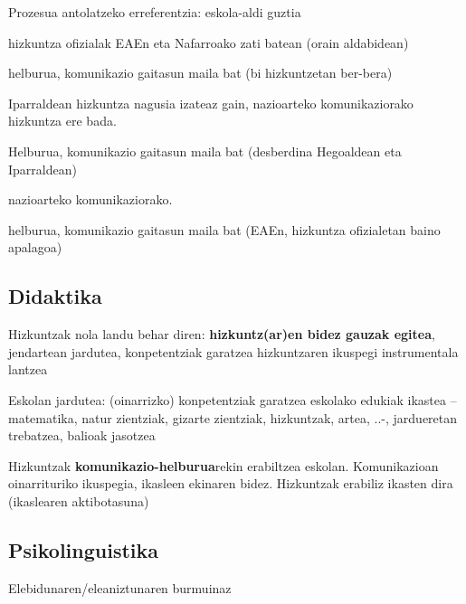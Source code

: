 \documentclass[
]{book}
\providecommand{\tightlist}{%
  \setlength{\itemsep}{0pt}\setlength{\parskip}{0pt}}
\begin{document}
Prozesua antolatzeko erreferentzia: eskola-aldi guztia

\begin{description}
\tightlist
\item[Euskara eta gaztelania]
hizkuntza ofizialak EAEn eta Nafarroako zati batean (orain aldabidean)

helburua, komunikazio gaitasun maila bat (bi hizkuntzetan ber-bera)
\item[Frantsesa]
Iparraldean hizkuntza nagusia izateaz gain, nazioarteko komunikaziorako hizkuntza ere bada.

Helburua, komunikazio gaitasun maila bat (desberdina Hegoaldean eta Iparraldean)
\item[Ingelesa]
nazioarteko komunikaziorako.

helburua, komunikazio gaitasun maila bat (EAEn, hizkuntza ofizialetan baino apalagoa)
\end{description}

\hypertarget{didaktika}{%
\subsection{Didaktika}\label{didaktika}}

Hizkuntzak nola landu behar diren: \textbf{hizkuntz(ar)en bidez gauzak egitea}, jendartean jardutea, konpetentziak garatzea hizkuntzaren ikuspegi instrumentala lantzea

Eskolan jardutea: (oinarrizko) konpetentziak garatzea eskolako edukiak ikastea --matematika, natur zientziak, gizarte zientziak, hizkuntzak, artea, ..-, jardueretan trebatzea, balioak jasotzea

Hizkuntzak \textbf{komunikazio-helburua}rekin erabiltzea eskolan. Komunikazioan oinarrituriko ikuspegia, ikasleen ekinaren bidez. Hizkuntzak erabiliz ikasten dira (ikaslearen aktibotasuna)

\hypertarget{psikolinguistika-1}{%
\subsection{Psikolinguistika}\label{psikolinguistika-1}}

Elebidunaren/eleaniztunaren burmuinaz
\end{document}
